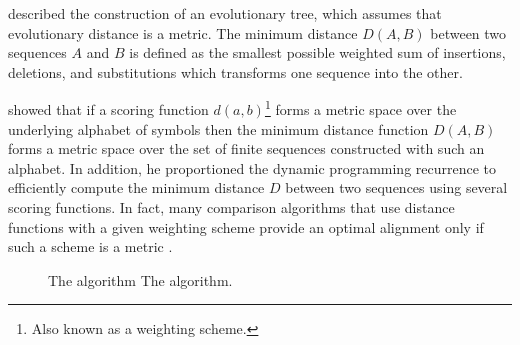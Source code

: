\citet{sellers:1974a} described the construction of an evolutionary tree, which assumes that evolutionary
distance is a metric. The minimum distance $D(A,B)$ between two sequences $A$ and $B$ is defined as the 
smallest possible weighted sum of insertions, deletions, and substitutions which transforms one sequence
into the other.

\citeauthor{sellers:1974a} showed that if a scoring function $d(a,b)$\footnote{Also known as a weighting 
scheme.} forms a metric space over the underlying alphabet of symbols then the minimum distance function 
$D(A,B)$ forms a metric space over the set of finite sequences constructed with such an alphabet. In 
addition, he proportioned the dynamic programming recurrence to efficiently compute the minimum distance $D$
between two sequences using several scoring functions. In fact, many comparison algorithms that use 
distance functions with a given weighting scheme provide an optimal alignment only if such a scheme is a 
metric \citep{tyler:1991a}.


\begin{figure}[t!]
\begin{center}
          {The \citeauthor{needleman:1970a} algorithm}%
          {The \citeauthor{needleman:1970a} algorithm.}%
          {}
\end{center}
\end{figure}


